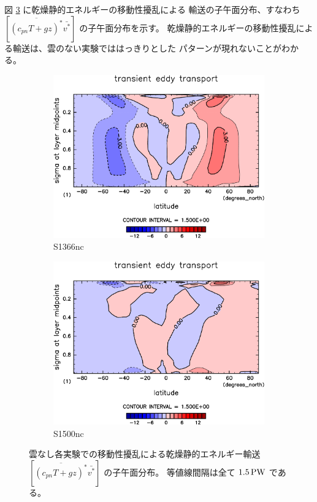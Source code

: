 \documentclass[body]{subfiles}
\begin{document}
図 \ref{乾燥静的エネルギー移動性擾乱nc} に乾燥静的エネルギーの移動性擾乱による
輸送の子午面分布、すなわち \([\overline{(c_{pn}T+gz)^*}\bar{v^*}]\) の子午面分布を示す。
乾燥静的エネルギーの移動性擾乱による輸送は、雲のない実験でははっきりとした
パターンが現れないことがわかる。

\begin{figure}[t]
	\centering
	\begin{subfigure}{.4\textwidth}
		\centering
		\includegraphics[width=\columnwidth]{S1366-nc/MeriHeatTransTest@dryStatEn_TE,time=3650:4015-crop-rotate.pdf}
		\caption{S1366nc}\label{乾燥静的エネルギー移動性擾乱S1366nc}
	\end{subfigure}
	\begin{subfigure}{.4\textwidth}
		\centering
		\includegraphics[width=\columnwidth]{S1500-nc/MeriHeatTransTest@dryStatEn_TE,time=3650:4015-crop-rotate.pdf}
		\caption{S1500nc}\label{乾燥静的エネルギー移動性擾乱S1500nc}
	\end{subfigure}
	\caption[雲なし各実験での移動性擾乱に依る乾燥静的エネルギー輸送の子午面分布]{
		雲なし各実験での移動性擾乱による乾燥静的エネルギー輸送\([\overline{(c_{pn}T+gz)^*}\bar{v^*}]\) の子午面分布。
		等値線間隔は全て \(1.5\hmu{PW}\) である。
	}\label{乾燥静的エネルギー移動性擾乱nc}
\end{figure}
\end{document}
